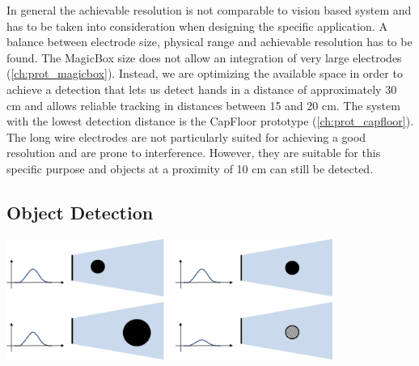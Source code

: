 In general the achievable resolution is not comparable to vision based system and has to be taken into consideration when designing the specific application. A balance between electrode size, physical range and achievable resolution has to be found. The MagicBox size does not allow an integration of very large electrodes (\ref{ch:prot_magicbox}). Instead, we are optimizing the available space in order to achieve a detection that lets us detect hands in a distance of approximately 30 cm and allows reliable tracking in distances between 15 and 20 cm. The system with the lowest detection distance is the CapFloor prototype (\ref{ch:prot_capfloor}). The long wire electrodes are not particularly suited for achieving a good resolution and are prone to interference. However, they are suitable for this specific purpose and objects at a proximity of 10 cm can still be detected. 
\subsection{Object Detection}
\begin{minipage}{\linewidth}
\centering
\includegraphics[width=0.8\textwidth]{images/limit_detection}
\label{fig:disc_obj_detection}
\end{minipage}

